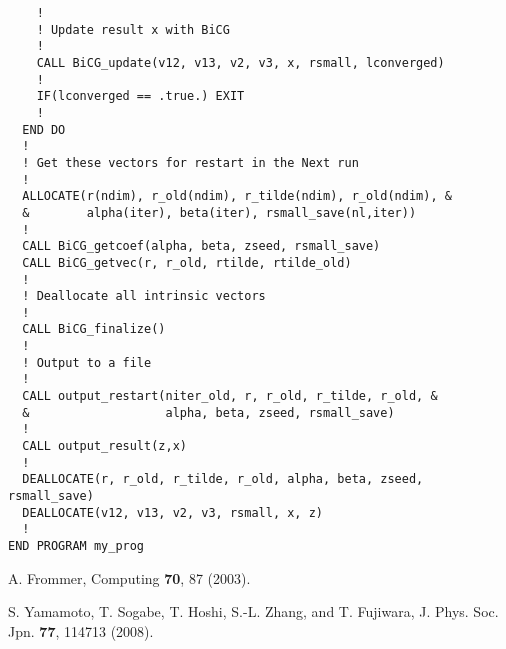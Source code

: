 \documentclass[12pt,titlepage]{jarticle}
\begin{document}
\begin{lstlisting}
    !
    ! Update result x with BiCG
    !
    CALL BiCG_update(v12, v13, v2, v3, x, rsmall, lconverged)
    !
    IF(lconverged == .true.) EXIT
    !
  END DO
  !
  ! Get these vectors for restart in the Next run
  !
  ALLOCATE(r(ndim), r_old(ndim), r_tilde(ndim), r_old(ndim), &
  &        alpha(iter), beta(iter), rsmall_save(nl,iter))
  !
  CALL BiCG_getcoef(alpha, beta, zseed, rsmall_save)
  CALL BiCG_getvec(r, r_old, rtilde, rtilde_old)
  !
  ! Deallocate all intrinsic vectors
  !
  CALL BiCG_finalize()
  !
  ! Output to a file
  !
  CALL output_restart(niter_old, r, r_old, r_tilde, r_old, &
  &                   alpha, beta, zseed, rsmall_save)
  !
  CALL output_result(z,x)
  !
  DEALLOCATE(r, r_old, r_tilde, r_old, alpha, beta, zseed, rsmall_save)
  DEALLOCATE(v12, v13, v2, v3, rsmall, x, z)
  !
END PROGRAM my_prog
\end{lstlisting}


\begin{thebibliography}{99}
  A. Frommer, Computing {\bf 70}, 87 (2003).
  
  S. Yamamoto, T. Sogabe, T. Hoshi, S.-L. Zhang, and T. Fujiwara, J. Phys. Soc. Jpn. {\bf 77}, 114713 (2008).
\end{thebibliography}
\end{document}
